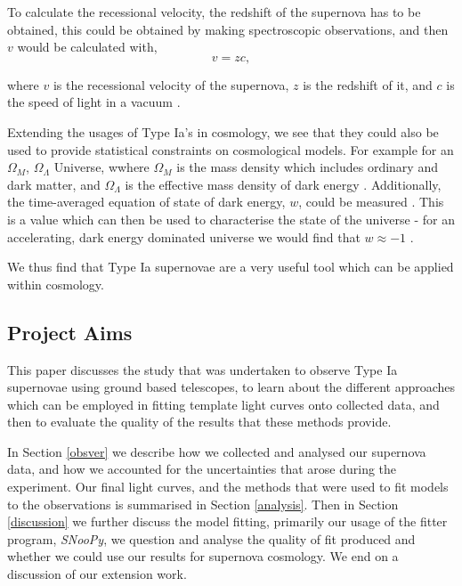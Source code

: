 \documentclass[twocolumn]{revtex4}
\begin{document}
To calculate the recessional velocity, the redshift of the supernova has to be obtained, this could be obtained by making spectroscopic observations, and then $v$ would be calculated with,
 \begin{equation}
v = zc,
\label{eqn:redshift}
\end{equation}

where $v$ is the recessional velocity of the supernova, $z$ is the redshift of it, and $c$ is the speed of light in a vacuum \cite{mod_ast}.

Extending the usages of Type Ia's in cosmology, we see that they could also be used to provide statistical constraints on cosmological models. For example for an $\Omega_M$, $\Omega_{\Lambda}$ Universe, wwhere $\Omega_M$ is the mass density which includes ordinary and dark matter, and $\Omega_{\Lambda}$ is the effective mass density of dark energy \cite{mod_ast, exp_uni_sn}. Additionally, the time-averaged equation of state of dark energy, $w$, could be measured \cite{sn_consts}. This is a value which can then be used to characterise the state of the universe - for an accelerating, dark energy dominated universe we would find that $w \approx -1$ \cite{longair}. 

We thus find that Type Ia supernovae are a very useful tool which can be applied within cosmology.

\vspace{-3ex}
\subsection{Project Aims}
\vspace{-2ex}
This paper discusses the study that was undertaken to observe Type Ia supernovae using ground based telescopes, to learn about the different approaches which can be employed in fitting template light curves onto collected data, and then to evaluate the quality of the results that these methods provide.

In Section \ref{obsver} we describe how we collected and analysed our supernova data, and how we accounted for the uncertainties that arose during the experiment. Our final light curves, and the methods that were used to fit models to the observations is summarised in Section \ref{analysis}. Then in Section \ref{discussion} we further discuss the model fitting, primarily our usage of the fitter program, \textit{SNooPy}, we question and analyse the quality of fit produced and whether we could use our results for supernova cosmology. We end on a discussion of our extension work.
\end{document}
